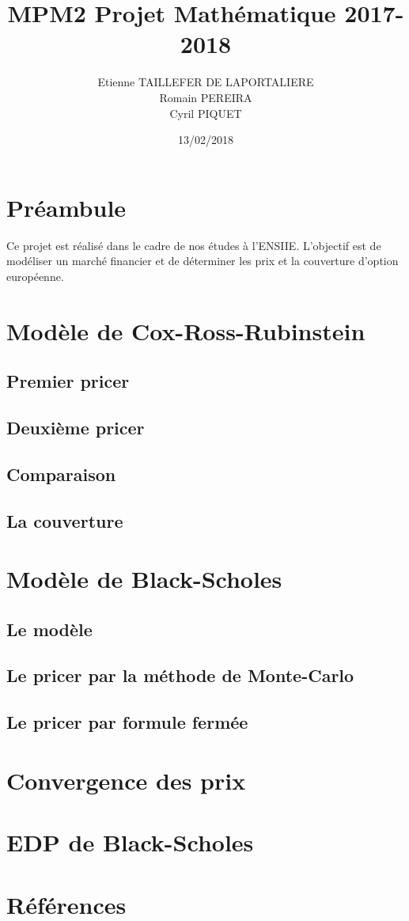 \documentclass[10pt]{article}
\title{MPM2 Projet Mathématique 2017-2018}
\author{
			Etienne TAILLEFER DE LAPORTALIERE \\
			Romain PEREIRA\\
			Cyril PIQUET
}
\date{13/02/2018}
\begin{document}
	\maketitle
	\tableofcontents

	\section*{Préambule}

		Ce projet est réalisé dans le cadre de nos études à l'ENSIIE.
		L'objectif est de modéliser un marché financier et de déterminer les prix et la couverture d'option européenne.

	\section{Modèle de Cox-Ross-Rubinstein}
		\subsection{Premier pricer}
		\subsection{Deuxième pricer}
		\subsection{Comparaison}
		\subsection{La couverture}
		
	\section{Modèle de Black-Scholes}
		\subsection{Le modèle}
		\subsection{Le pricer par la méthode de Monte-Carlo}
		\subsection{Le pricer par formule fermée}
		
	\section{Convergence des prix}
	
	\section{EDP de Black-Scholes}
		
	\newpage
	\section{Références}
		\begin{thebibliography}{}
		\end{thebibliography}
\end{document}
